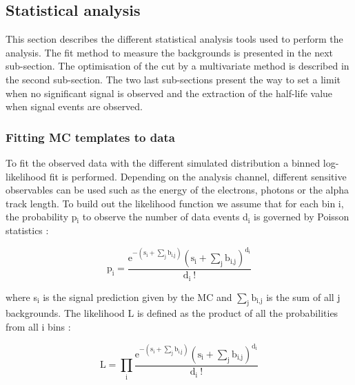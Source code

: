 \documentclass[main.tex]{subfiles}
\begin{document}
\FloatBarrier


\subsection{Statistical analysis}\label{sec:StatAnalysisTools}


\NI This section describes the different statistical analysis tools used to perform the analysis. The fit method to measure the backgrounds is presented in the next sub-section. The optimisation of the cut by a multivariate method is described in the second sub-section. The two last sub-sections present the way to set a limit when no significant signal is observed and the extraction of the half-life value when signal events are observed.


\subsubsection{Fitting MC templates to data}


\NI To fit the observed data with the different simulated distribution a binned log-likelihood fit is performed. Depending on the analysis channel, different sensitive observables can be used such as the energy of the electrons, photons or the alpha track length. To build out the likelihood function we assume that for each bin i, the probability p$_\text{i}$ to observe the number of data events d$_\text{i}$ is governed by Poisson statistics :   

\begin{equation}
\text{p}_\text{i} = \frac {\text{e}^{-(\text{s}_\text{i}+\sum_\text{j} \text{b}_{\text{i,j}})} (\text{s}_\text{i}+ \sum_\text{j} \text{b}_{\text{i,j}})^{\text{d}_{\text{i}}} }  {\text{d}_\text{i}~\text{!}} 
\end{equation}


\bigskip


\NI where s$_\text{i}$ is the signal prediction given by the MC and $\sum_\text{j} \text{b}_{\text{i,j}}$ is the sum of all j backgrounds. The likelihood L is defined as the product of all the probabilities from all i bins : 


\begin{equation}\label{eq:likelihood}
\text{L} = \prod_\text{i} \frac {\text{e}^{-(\text{s}_\text{i}+\sum_\text{j} \text{b}_{\text{i,j}})} (\text{s}_\text{i} + \sum_\text{j} \text{b}_{\text{i,j}} )^{\text{d}_\text{i}} } {\text{d}_\text{i}~\text{!}}
\end{equation}
\end{document}
